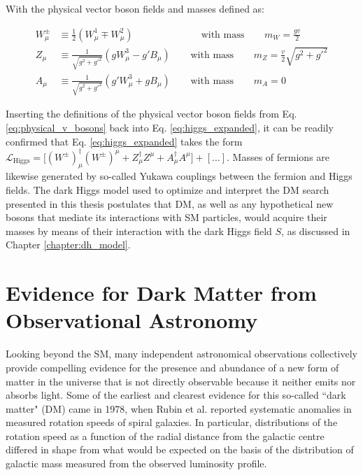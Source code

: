 With the physical vector boson fields and masses defined as:

\begin{equation}
\label{eq:physical_v_bosons}
\begin{split}
W^\pm_\mu & \equiv \frac{1}{2}(W_\mu^1 \mp W_\mu^2) \phantom{xxxxxxxxxlxx}\text{ with mass }\phantom{xxx} m_W=\frac{gv}{2} \\
Z_\mu & \equiv \frac{1}{\sqrt{g^2+g'^2}}(gW_\mu^3-g'B_\mu) \phantom{xxx}\text{ with mass }\phantom{xxx} m_Z = \frac{v}{2}\sqrt{g^2+g'^2} \\
A_\mu & \equiv \frac{1}{\sqrt{g^2+g'^2}}(g'W^3_\mu+gB_\mu) \phantom{xxx}\text{ with mass }\phantom{xxx} m_A = 0
\end{split}
\end{equation}

Inserting the definitions of the physical vector boson fields from Eq. \ref{eq:physical_v_bosons} back into Eq. \ref{eq:higgs_expanded}, it can be readily confirmed that Eq. \ref{eq:higgs_expanded} takes the form \(\mathcal{L}_\text{Higgs} = \big[(W^\pm)_\mu^\dagger(W^\pm)^\mu + Z_\mu^\dagger Z^\mu + A_\mu^\dagger A^\mu\big] + [...]\). Masses of fermions are likewise generated by so-called Yukawa couplings \cite{weinberg_1967} between the fermion and Higgs fields. The dark Higgs model used to optimize and interpret the DM search presented in this thesis postulates that DM, as well as any hypothetical new bosons that mediate its interactions with SM particles, would acquire their masses by means of their interaction with the dark Higgs field \(S\), as discussed in Chapter \ref{chapter:dh_model}. 


\section{Evidence for Dark Matter from Observational Astronomy}

Looking beyond the SM, many independent astronomical observations collectively provide compelling evidence for the presence and abundance of a new form of matter in the universe that is not directly observable because it neither emits nor absorbs light. Some of the earliest and clearest evidence for this so-called ``dark matter" (DM) came in 1978, when Rubin et al. \cite{Rubin_et_al} reported systematic anomalies in measured rotation speeds of spiral galaxies. In particular, distributions of the rotation speed as a function of the radial distance from the galactic centre differed in shape from what would be expected on the basis of the distribution of galactic mass measured from the observed luminosity profile. 


